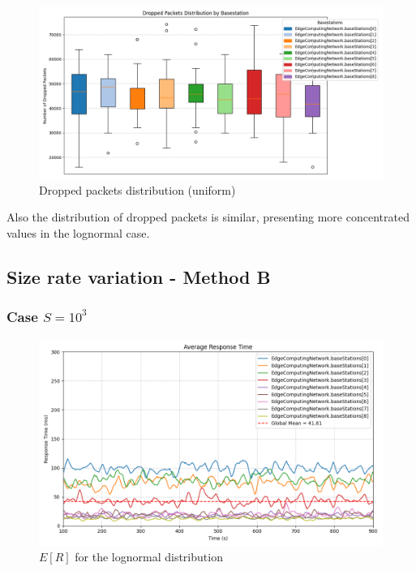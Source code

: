 \documentclass{report}
\begin{document}
\begin{figure}[H]
    \centering
    \includegraphics[width=\textwidth]{img/plots/uni_1e4_A/dropped.png}
    \caption{Dropped packets distribution (uniform)}
\end{figure}

Also the distribution of dropped packets is similar, presenting more concentrated values in the lognormal case.

\subsection{Size rate variation - Method B}
\subsubsection*{Case $S=10^3$}

\begin{figure}[H]
    \centering
    \includegraphics[width=\textwidth]{img/plots/log_1e3_B/resptime.png}
    \caption{$E[R]$ for the lognormal distribution}
\end{figure}
\end{document}
